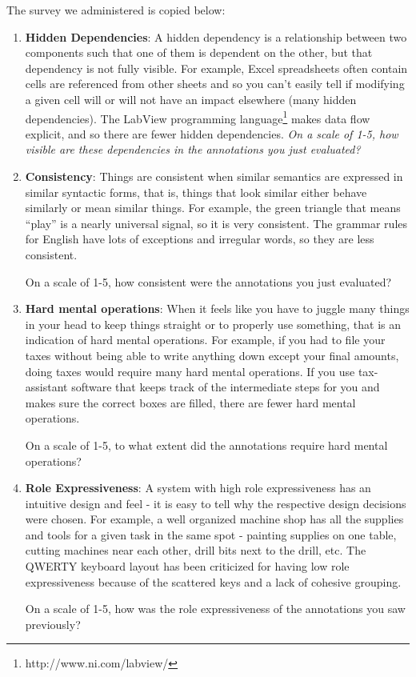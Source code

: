 \documentclass[conference]{IEEEtran}
\begin{document}
The survey we administered is copied below:
\begin{enumerate}
	\item \textbf{Hidden Dependencies}: A hidden dependency is a relationship between two components such that one of them is dependent on the other, but that dependency is not fully visible. For example, Excel spreadsheets often contain cells are referenced from other sheets and so you can’t easily tell if modifying a given cell will or will not have an impact elsewhere (many hidden dependencies). The LabView programming language\footnote{http://www.ni.com/labview/} makes data flow explicit, and so there are fewer hidden dependencies. 
	\emph{On a scale of 1-5, how visible are these dependencies in the annotations you just evaluated?}

	\item \textbf{Consistency}: Things are consistent when similar semantics are expressed in similar syntactic forms, that is, things that look similar either behave similarly or mean similar things. For example, the green triangle that means ``play'' is a nearly universal signal, so it is very consistent. The grammar rules for English have lots of exceptions and irregular words, so they are less consistent.

On a scale of 1-5, how consistent were the annotations you just evaluated?

	\item \textbf{Hard mental operations}: When it feels like you have to juggle many things in your head to keep things straight or to properly use something, that is an indication of hard mental operations. For example, if you had to file your taxes without being able to write anything down except your final amounts, doing taxes would require many hard mental operations. If you use tax-assistant software that keeps track of the intermediate steps for you and makes sure the correct boxes are filled, there are fewer hard mental operations.

On a scale of 1-5, to what extent did the annotations require hard mental operations?

	\item \textbf{Role Expressiveness}: A system with high role expressiveness has an intuitive design and feel - it is easy to tell why the respective design decisions were chosen. For example, a well organized machine shop has all the supplies and tools for a given task in the same spot - painting supplies on one table, cutting machines near each other, drill bits next to the drill, etc. The QWERTY keyboard layout has been criticized for having low role expressiveness because of the scattered keys and a lack of cohesive grouping.

On a scale of 1-5, how was the role expressiveness of the annotations you saw previously?

\end{enumerate}
\end{document}
